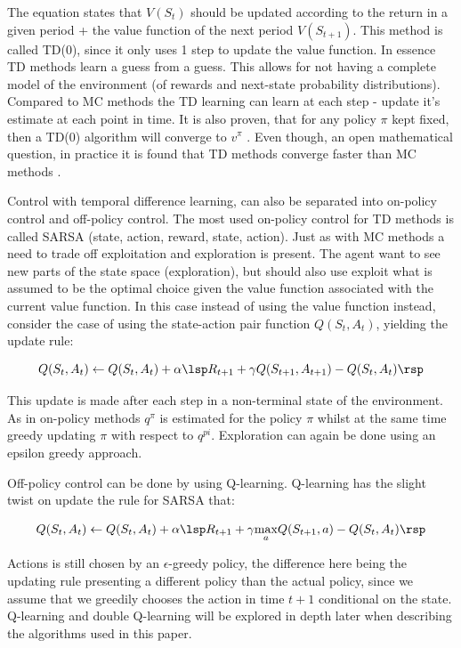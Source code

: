 The equation states that $V(S_t)$ should be updated according to the return in a given period + the value function of the next period $V(S_{t+1})$. This method is called TD(0), since it only uses 1 step to update the value function. In essence TD methods learn a guess from a guess. This allows for not having a complete model of the environment (of rewards and next-state probability distributions). Compared to MC methods the TD learning can learn at each step - update it's estimate at each point in time. It is also proven, that for any policy $\pi$ kept fixed, then a TD(0) algorithm will converge to $v^{\pi}$ \parencite{sutton_reinforcement_2018}. Even though, an open mathematical question, in practice it is found that TD methods converge faster than MC methods \parencite{sutton_reinforcement_2018}.

Control with temporal difference learning, can also be separated into on-policy control and off-policy control. The most used on-policy control for TD methods is called SARSA (state, action, reward, state, action). Just as with MC methods a need to trade off exploitation and exploration is present. The agent want to see new parts of the state space (exploration), but should also use exploit what is assumed to be the optimal choice given the value function associated with the current value function. In this case instead of using the value function instead, consider the case of using the state-action pair function $Q(S_t, A_t)$, yielding the update rule:

\begin{equation}
    Q(S_t, A_t) \leftarrow Q(S_t, A_t) + \alpha \lsp R_{t+1} + \gamma Q(S_{t+1}, A_{t+1}) - Q(S_t, A_t) \rsp
\end{equation}

This update is made after each step in a non-terminal state of the environment. As in on-policy methods $q^{\pi}$ is estimated for the policy $\pi$ whilst at the same time greedy updating $\pi$ with respect to $q^{pi}$. Exploration can again be done using an epsilon greedy approach.

Off-policy control can be done by using Q-learning. Q-learning has the slight twist on update the rule for SARSA that:

\begin{equation}
    Q(S_t, A_t) \leftarrow Q(S_t, A_t) + \alpha \lsp R_{t+1} + \gamma \underset{a}{\max} Q(S_{t + 1}, a) - Q(S_t, A_t) \rsp 
\end{equation}

Actions is still chosen by an $\epsilon$-greedy policy, the difference here being the updating rule presenting a different policy than the actual policy, since we assume that we greedily chooses the action in time $t+1$ conditional on the state. Q-learning and double Q-learning will be explored in depth later when describing the algorithms used in this paper.

